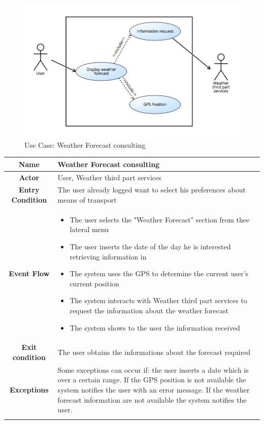 \documentclass[numbers=noenddot, 12pt, a4paper, oneside]{scrbook}
\begin{document}
\begin{figure}[H]
	\includegraphics[width=1\textwidth]{usecases/Scenario4}
	\caption{Use Case: Weather Forecast consulting}
\end{figure}

\begin{tabular}{|c|p{}|}
	\hline
	\parbox[c][6ex]{6ex}{\centering \textbf{Name}} & Weather Forecast consulting
	
	\\
	\hline
	\parbox[c][6ex]{6ex}{\centering \textbf{Actor}} & User, Weather third part services
	 \\
	\hline
	\parbox[c][10ex]{15ex}{\centering \textbf{Entry Condition}} & The user already logged want to select his preferences about means of transport
	\\
	\hline
	\parbox[c][10ex]{12ex}{\centering \textbf{Event Flow}} & \begin{itemize}
		\item The user selects the "Weather Forecast" section from thee lateral menu
		\item The user inserts the date of the day he is interested retrieving information in
		\item The system uses the GPS to determine the current user's current position
		\item The system interacts with Weather third part services to request the information about the weather forecast
		\item The system shows to the user the information received
		
		
	\end{itemize}\\
	\hline
	\parbox[c][7ex]{12ex}{\centering \textbf{Exit condition}} & The user obtains the informations about the forecast required\\\hline
	\parbox[c][10ex]{13ex}{\centering \textbf{Exceptions}} & Some exceptions can occur if: the user inserts a date which is over a certain range. If the GPS position is not available the system notifies the user with an error message. If the weather forecast information are not available the system notifies the user.
	 
	\\ \\ \hline	
	
	
\end{tabular}
\end{document}
